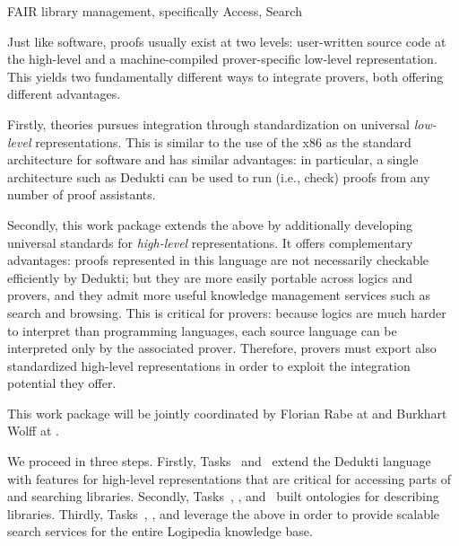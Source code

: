 \begin{workpackage}[id=structuring,wphases=0-48,type=RTD,
  short=Structured Theories and Metadata,%
  title=Structured Theories and Metadata,
  lead=Fau,
  BolRM=6,
  TumRM=6,
  FauRM=48,
  SacRM=48]
  



\begin{wpobjectives}
FAIR library management, specifically Access, Search

Just like software, proofs usually exist at two levels: user-written source code at the high-level and a machine-compiled prover-specific low-level representation.
This yields two fundamentally different ways to integrate provers, both offering different advantages.

Firstly, theories pursues integration through standardization on universal \emph{low-level} representations.
This is similar to the use of the x86 as the standard architecture for software and has similar advantages: in particular, a single architecture such as Dedukti can be used to run (i.e., check) proofs from any number of proof assistants.

Secondly, this work package extends the above by additionally developing universal standards for \emph{high-level} representations.
It offers complementary advantages: proofs represented in this language are not necessarily checkable efficiently by Dedukti; but they are more easily portable across logics and provers, and they admit more useful knowledge management services such as search and browsing.
This is critical for provers: because logics are much harder to interpret than programming languages, each source language can be interpreted only by the associated prover.
Therefore, provers must export also standardized high-level representations in order to exploit the integration potential they offer.

This work package will be jointly coordinated by Florian Rabe at  and Burkhart Wolff at .
\end{wpobjectives}


\begin{wpdescription}
We proceed in three steps.
Firstly, Tasks~ and~ extend the Dedukti language with features for high-level representations that are critical for accessing parts of and searching libraries.
Secondly, Tasks~, , and~ built ontologies for describing libraries.
Thirdly, Tasks~, , and  leverage the above in order to provide scalable search services for the entire Logipedia knowledge base.
\end{wpdescription}


\end{workpackage}
